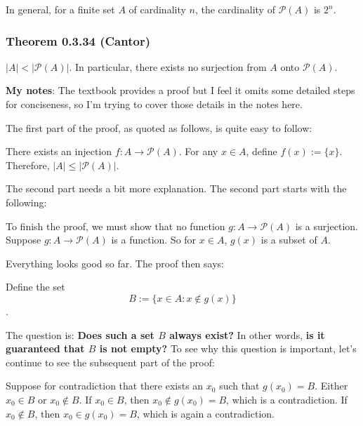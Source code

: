 \documentclass[12pt, letterpaper, oneside]{book}
\begin{document}
In general, for a finite set $A$ of cardinality $n$, the cardinality of
$\mathcal{P}(A)$ is $2^n$.

\subsubsection{Theorem 0.3.34 (Cantor)}

$|A| < |\mathcal{P}(A)|$. In particular, there exists no surjection from $A$
onto $\mathcal{P}(A)$.

\colorbox{lime!100}{\textbf{My notes}}: The textbook provides a proof but I
feel it omits some detailed steps for conciseness, so I'm trying to cover those
details in the notes here.

The first part of the proof, as quoted as follows, is quite easy to follow:

\begin{displayquote}
  There exists an injection $f: A \rightarrow \mathcal{P}(A)$. For any $x \in
    A$, define $f(x) := \{x\}$. Therefore, $|A| \leq |\mathcal{P}(A)|$.
\end{displayquote}

The second part needs a bit more explanation. The second part starts with the
following:

\begin{displayquote}
  To finish the proof, we must show that no function $g: A \rightarrow
    \mathcal{P}(A)$ is a surjection. Suppose $g: A \rightarrow \mathcal{P}(A)$ is
  a function. So for $x \in A$, $g(x)$ is a subset of $A$.
\end{displayquote}

Everything looks good so far. The proof then says:

\begin{displayquote}
  Define the set \[B:= \{x \in A: x \notin g(x)\}\].
\end{displayquote}

The question is: \textbf{Does such a set $B$ always exist?} In other words,
\textbf{is it guaranteed that $B$ is not empty?} To see why this question is
important, let's continue to see the subsequent part of the proof:

\begin{displayquote}
  Suppose for contradiction that there exists an $x_0$ such that $g(x_0) = B$.
  Either $x_0 \in B$ or $x_0 \notin B$. If $x_0 \in B$, then $x_0 \notin g(x_0)
    = B$, which is a contradiction. If $x_0 \notin B$, then $x_0 \in g(x_0) = B$,
  which is again a contradiction.
\end{displayquote}
\end{document}
